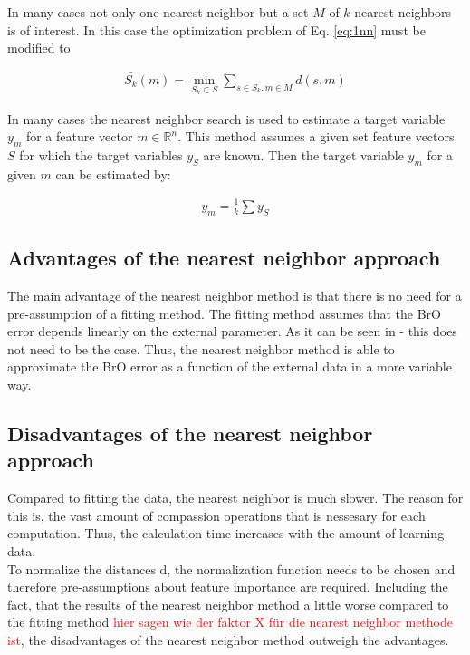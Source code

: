 \documentclass  [
  paper    = a4,
  BCOR     = 10mm,
  twoside,
  fontsize = 12pt,
  fleqn,
  toc      = bibnumbered,
  toc      = listofnumbered,
  numbers  = noendperiod,
  headings = normal,
  listof   = leveldown,
  version  = 3.03
]                                       {scrreprt}
\begin{document}
In many cases not only one nearest neighbor but a set $M$ of $k$ nearest neighbors is of interest. In this case the optimization problem of Eq. \ref{eq:1nn} must be modified to

%

\begin{align}
\bar{S_k}(m) = \min_{S_k \subset S} \sum_{s \in S_k, m \in M} d(s, m) \label{eq:knn}
\end{align}

%

In many cases the nearest neighbor search is used to estimate a target variable $y_m$ for a feature vector $m \in \mathbb{R}^n$. This method assumes a given set feature vectors $S$ for which the target variables $y_S$ are known. Then the target variable $y_m$ for a given $m$ can be estimated by:

%

\begin{align}
y_m = \frac{1}{k} \sum y_S \label{eq:knn_regression}
\end{align}

%

\subsection*{Advantages of the nearest neighbor approach}
	The main advantage of the nearest neighbor method is that there is no need for a pre-assumption of a fitting method. The fitting method assumes that the BrO error depends linearly  on the external parameter. As it can be seen in - this does not need to be the case. Thus, the nearest neighbor method is able to approximate the BrO error as a function of the external data in a more variable way.
%
\subsection*{Disadvantages of the nearest neighbor approach}
	Compared to fitting the data, the nearest neighbor is much slower. The reason for this is, the vast amount of compassion operations that is nessesary for each computation. Thus, the calculation time increases with the amount of learning data.\\
	To normalize the distances d, the normalization function needs to be chosen and therefore pre-assumptions about feature importance are required.
	Including the fact, that the results of the nearest neighbor method a little worse compared to the fitting method \textcolor{red}{hier sagen wie der faktor X für die nearest neighbor methode ist}, the disadvantages of the nearest neighbor method outweigh the advantages.
\end{document}
